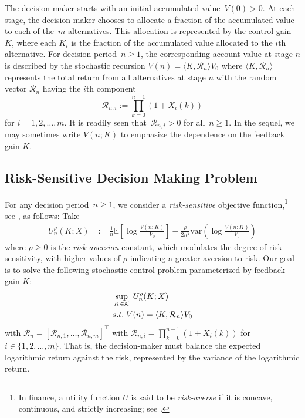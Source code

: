 \documentclass[letterpaper, 10 pt, journal, twoside]{IEEEtran}  %
\begin{document}
The decision-maker starts with an initial accumulated value~$V(0)>0$. At each stage, the decision-maker chooses to allocate a fraction of the accumulated value to each of the~$m$ alternatives. This allocation is represented by the control gain~$K$, where each $K_i$ is the fraction of the accumulated value allocated to the $i$th alternative.
For decision period~$n \geq 1$, the corresponding account value at stage $n$ is described by the stochastic recursion
	$
	V(n) =  \langle K, \mathcal{R}_n \rangle V_0 
	$
where $\langle K, \mathcal{R}_n \rangle$ represents the total return from all alternatives at stage $n$ with the random vector $\mathcal{R}_n$ having the $i$th component 
	$$
	\mathcal{R}_{n,i} := \prod_{k=0}^{n-1} (1+X_i(k)) 
	$$
 for $i=1,2, \ldots, m$.
It is readily seen that~{$\mathcal{R}_{n,i} > 0$} for all~$n \geq 1$.
In the sequel, we may sometimes write $V(n; K)$ to emphasize the dependence on the feedback gain $K$. 


 


\subsection{Risk-Sensitive Decision Making Problem}
For any decision period~$n \geq 1$, we consider a  \textit{risk-sensitive} objective function,\footnote{In finance, a utility function $U$ is said to be \textit{risk-averse} if it is concave, continuous, and strictly increasing; see \cite{luenberger2013investment}. } see \cite{luenberger1993preference}, as follows:
Take
\begin{align} \label{eq: risk-sensitive objective}
	{U_n^\rho}(K; X) 
	&:= \frac{1}{n} \mathbb{E}\left[ \log \frac{V(n; K)}{V_0} \right] - \frac{\rho}{2n^2}\text{var}\left( \log \frac{V(n; K)}{V_0} \right)
\end{align}
where $\rho \geq 0$ is the \textit{risk-aversion} constant, which modulates the degree of risk sensitivity, with higher values of $\rho$ indicating a greater aversion to risk.
Our goal is to solve the following stochastic control problem parameterized by feedback gain $K$:
\begin{align} \label{problem: stochastic optimal control problem}
    \begin{aligned}
        &\sup_{K \in \mathcal{K}}\; U_n^\rho (K; X)\\
        &{\rm s.t. } \; V(n) = \langle K, \mathcal{R}_n \rangle V_0 
    \end{aligned}
\end{align}
with $\mathcal{R}_n = [\mathcal{R}_{n,1}, \dots, \mathcal{R}_{n,m}]^\top$ with $ \mathcal{R}_{n,i} = \prod_{k=0}^{n - 1} ( 1 + X_i(k) ) $ for $i \in \{1, 2, \dots, m \}$.
That is, the decision-maker must balance the expected logarithmic return against the risk, represented by the variance of the logarithmic return.
\end{document}
